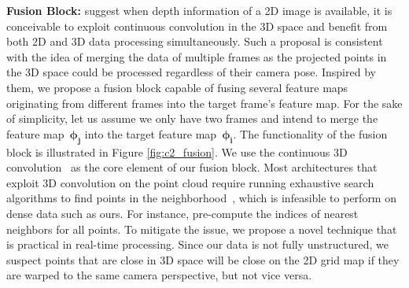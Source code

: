 \bigbreak\noindent\textbf{Fusion Block:} \cite{chen2019learning} suggest when depth information of a 2D image is available, it is conceivable to exploit continuous convolution in the 3D space and benefit from both 2D and 3D data processing simultaneously. Such a proposal is consistent with the idea of merging the data of multiple frames as the projected points in the 3D space could be processed regardless of their camera pose. Inspired by them, we propose a fusion block capable of fusing several feature maps originating from different frames into the target frame's feature map. For the sake of simplicity, let us assume we only have two frames and intend to merge the feature map~$\boldsymbol{\phi_j}$ into the target feature map~$\boldsymbol{\phi_i}$. The functionality of the fusion block is illustrated in Figure \ref{fig:c2_fusion}. We use the continuous 3D convolution~\cite{wang2018deep} as the core element of our fusion block. Most architectures that exploit 3D convolution on the point cloud require running exhaustive search algorithms to find points in the neighborhood~\cite{chen2019learning, li2018pointcnn, xu2018spidercnn, wu2019pointconv, boulch2020convpoint, wang2018deep}, which is infeasible to perform on dense data such as ours. For instance,  \cite{chen2019learning} pre-compute the indices of nearest neighbors for all points. To mitigate the issue, we propose a novel technique that is practical in real-time processing. Since our data is not fully unstructured, we suspect points that are close in 3D space will be close on the 2D grid map if they are warped to the same camera perspective, but not vice versa. 

